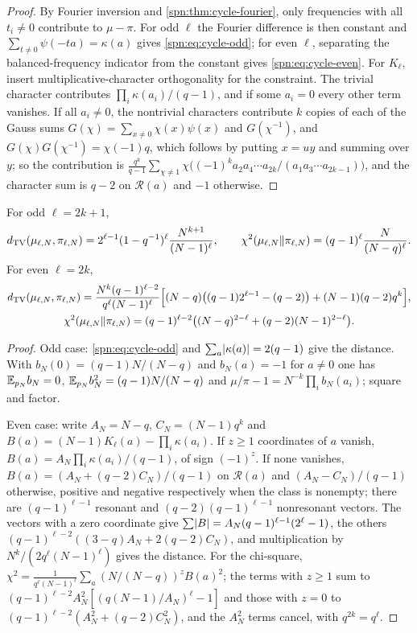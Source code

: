 \begin{proof}
By Fourier inversion and \cref{spn:thm:cycle-fourier}, only frequencies with all $t_i\ne0$
contribute to $\mu-\pi$. For odd $\ell$ the Fourier difference is then constant and
$\sum_{t\ne0}\psi(-ta)=\kappa(a)$ gives \eqref{spn:eq:cycle-odd}; for even $\ell$, separating the
balanced-frequency indicator from the constant gives \eqref{spn:eq:cycle-even}. For $K_\ell$, insert
multiplicative-character orthogonality for the constraint. The trivial character contributes
$\prod_i\kappa(a_i)/(q-1)$, and if some $a_i=0$ every other term vanishes. If all $a_i\ne0$, the
nontrivial characters contribute $k$ copies of each of the Gauss sums
$G(\chi)=\sum_{x\ne0}\chi(x)\psi(x)$ and $G(\chi^{-1})$, and $G(\chi)G(\chi^{-1})=\chi(-1)q$, which
follows by putting $x=uy$ and summing over $y$; so the contribution is
$\frac{q^k}{q-1}\sum_{\chi\ne1}\chi\bigl((-1)^ka_2a_4\cdots a_{2k}/(a_1a_3\cdots a_{2k-1})\bigr)$, and
the character sum is $q-2$ on $\mathcal R(a)$ and $-1$ otherwise.
\end{proof}

\begin{theorem}\label{spn:thm:cycle-distances}
For odd $\ell=2k+1$,
\[
 d_{\mathrm{TV}}(\mu_{\ell,N},\pi_{\ell,N})=2^{\ell-1}(1-q^{-1})^\ell\frac{N^{k+1}}{(N-1)^\ell},\qquad
 \chi^2(\mu_{\ell,N}\Vert\pi_{\ell,N})=(q-1)^\ell\frac N{(N-q)^\ell}.
\]
For even $\ell=2k$,
\begin{gather*}
 d_{\mathrm{TV}}(\mu_{\ell,N},\pi_{\ell,N})=\frac{N^k(q-1)^{\ell-2}}{q^\ell(N-1)^\ell}
 \Bigl[(N-q)\bigl((q-1)2^{\ell-1}-(q-2)\bigr)+(N-1)(q-2)q^k\Bigr],\\
 \chi^2(\mu_{\ell,N}\Vert\pi_{\ell,N})=(q-1)^{\ell-2}\bigl((N-q)^{2-\ell}+(q-2)(N-1)^{2-\ell}\bigr).
\end{gather*}
\end{theorem}

\begin{proof}
Odd case: \eqref{spn:eq:cycle-odd} and $\sum_a\lvert\kappa(a)\rvert=2(q-1)$ give the distance. With
$b_N(0)=(q-1)N/(N-q)$ and $b_N(a)=-1$ for $a\ne0$ one has $\mathbb{E}_{p_N}b_N=0$,
$\mathbb{E}_{p_N}b_N^2=(q-1)N/(N-q)$ and $\mu/\pi-1=N^{-k}\prod_ib_N(a_i)$; square and factor.

Even case: write $A_N=N-q$, $C_N=(N-1)q^k$ and $B(a)=(N-1)K_\ell(a)-\prod_i\kappa(a_i)$. If $z\ge1$
coordinates of $a$ vanish, $B(a)=A_N\prod_i\kappa(a_i)/(q-1)$, of sign $(-1)^z$. If none vanishes,
$B(a)=(A_N+(q-2)C_N)/(q-1)$ on $\mathcal R(a)$ and $(A_N-C_N)/(q-1)$ otherwise, positive and negative
respectively when the class is nonempty; there are $(q-1)^{\ell-1}$ resonant and
$(q-2)(q-1)^{\ell-1}$ nonresonant vectors. The vectors with a zero coordinate give
$\sum\lvert B\rvert=A_N(q-1)^{\ell-1}(2^\ell-1)$, the others $(q-1)^{\ell-2}((3-q)A_N+2(q-2)C_N)$, and
multiplication by $N^k/(2q^\ell(N-1)^\ell)$ gives the distance. For the chi-square,
$\chi^2=\frac1{q^\ell(N-1)^\ell}\sum_a(N/(N-q))^zB(a)^2$; the terms with $z\ge1$ sum to
$(q-1)^{\ell-2}A_N^2[(q(N-1)/A_N)^\ell-1]$ and those with $z=0$ to $(q-1)^{\ell-2}(A_N^2+(q-2)C_N^2)$,
and the $A_N^2$ terms cancel, with $q^{2k}=q^\ell$.
\end{proof}

